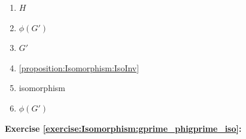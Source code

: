 %

\begin{multicols}{3}
\begin{enumerate}
\item
$H$

\item
$\phi(G')$

\item
$G'$

\item
\ref {proposition:Isomorphism:IsoInv}

\item
isomorphism

\item
$\phi(G')$
\end{enumerate}
\end{multicols}

\noindent\textbf{Exercise \ref{exercise:Isomorphism:gprime_phigprime_iso}:}
%
%
%


